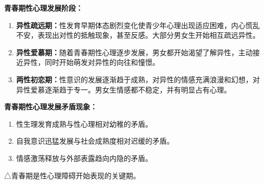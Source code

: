 \begin{tipbox}
\textbf{青春期性心理发展阶段：}

\begin{enumerate}[leftmargin=*]
    \item \textbf{异性疏远期：}性发育早期体态剧烈变化使青少年心理出现适应困难，内心慌乱不安，表现出对性的抵触现象，甚至反感。大部分男女生开始相互疏远异性。
    \item \textbf{异性爱慕期：}随着青春期性心理逐步发展，男女都开始渴望了解异性，主动接近异性，同时开始萌发对异性的向往和憧憬。
    \item \textbf{两性初恋期：}性意识的发展逐渐趋于成熟，对异性的情感充满浪漫和幻想，对异性爱慕逐渐趋于专一。男女生情感都不稳定，并有明显占有心理。
\end{enumerate}

\textbf{青春期性心理发展矛盾现象：}
\begin{enumerate}[leftmargin=*]
    \item 性生理发育成熟与性心理相对幼稚的矛盾。
    \item 自我意识迅猛发展与社会成熟度相对迟缓的矛盾。
    \item 情感激荡释放与外部表露趋向内隐的矛盾。
\end{enumerate}

△青春期是性心理障碍开始表现的关键期。
\end{tipbox}

